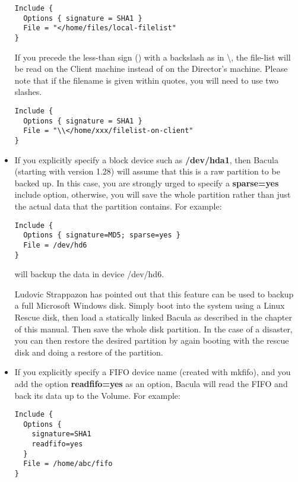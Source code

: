 \begin{itemize}
\footnotesize
\begin{verbatim}
Include {
  Options { signature = SHA1 }
  File = "</home/files/local-filelist"
}
\end{verbatim}
\normalsize

   If you precede the less-than sign (\lt{}) with a backslash as in
   \textbackslash{}\lt{}, the file-list will be read on the Client machine
   instead of on the Director's machine.  Please note that if the filename
   is given within quotes, you will need to use two slashes.

\footnotesize
\begin{verbatim}
Include {
  Options { signature = SHA1 }
  File = "\\</home/xxx/filelist-on-client"
}
\end{verbatim}
\normalsize

\item If you explicitly specify a block device such as {\bf /dev/hda1},  then
   Bacula (starting with version 1.28) will assume that this  is a raw partition
   to be backed up. In this case, you are strongly  urged to specify a {\bf
   sparse=yes} include option, otherwise, you  will save the whole partition
   rather than just the actual data that  the partition contains. For example: 

\footnotesize
\begin{verbatim}
Include {
  Options { signature=MD5; sparse=yes }
  File = /dev/hd6
}
\end{verbatim}
\normalsize

   will backup the data in device /dev/hd6.  

   Ludovic Strappazon has pointed out that this feature can be  used to backup a
   full Microsoft Windows disk. Simply boot into  the system using a Linux Rescue
   disk, then load a statically  linked Bacula as described in the 
    chapter of
   this manual. Then  save the whole disk partition. In the case of a disaster,
   you  can then restore the desired partition by again booting with  the rescue
   disk and doing a restore of the partition. 
   \item If you explicitly specify a FIFO device name (created with mkfifo),  and
   you add the option {\bf readfifo=yes} as an option, Bacula  will read the FIFO
   and back its data up to the Volume. For  example: 

\footnotesize
\begin{verbatim}
Include {
  Options {
    signature=SHA1
    readfifo=yes
  }
  File = /home/abc/fifo
}
\end{verbatim}
\normalsize


\end{itemize}
